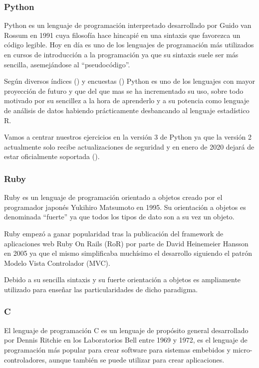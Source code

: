 \subsubsection{Python}

Python es un lenguaje de programación interpretado desarrollado por Guido van Rossum en 1991 cuya filosofía hace hincapié en una sintaxis que favorezca un código legible. Hoy en día es uno de los lenguajes de programación más utilizados en cursos de introducción a la programación ya que su sintaxis suele ser más sencilla, asemejándose al ``pseudocódigo''.

Según diversos índices (\cite{TIOBE2019}) y encuestas (\cite{stack_overflow_stack_2019}) Python es uno de los lenguajes con mayor proyección de futuro y que del que mas se ha incrementado su uso, sobre todo motivado por su sencillez a la hora de aprenderlo y a su potencia como lenguaje de análisis de datos habiendo prácticamente desbancando al lenguaje estadístico R.

\bigskip
Vamos a centrar nuestros ejercicios en la versión 3 de Python ya que la versión 2 actualmente solo recibe actualizaciones de seguridad y en enero de 2020 dejará de estar oficialmente soportada (\cite{python.org_pep_2018}).

\subsubsection{Ruby}

Ruby es un lenguaje de programación orientado a objetos creado por el programador japonés Yukihiro Matsumoto en 1995. Su orientación a objetos es denominada ``fuerte'' ya que todos los tipos de dato son a su vez un objeto.

\bigskip
Ruby empezó a ganar popularidad tras la publicación del framework de aplicaciones web Ruby On Rails (RoR) por parte de David Heinemeier Hansson en 2005 ya que el mismo simplificaba muchísimo el desarrollo siguiendo el patrón Modelo Vista Controlador (MVC).

\bigskip
Debido a su sencilla sintaxis y su fuerte orientación a objetos es ampliamente utilizado para enseñar las particularidades de dicho paradigma.

\subsubsection{C}

El lenguaje de programación C es un lenguaje de propósito general desarrollado por Dennis Ritchie en los Laboratorios Bell entre 1969 y 1972, es el lenguaje de programación más popular para crear software para sistemas embebidos y micro-controladores, aunque también se puede utilizar para crear aplicaciones.

